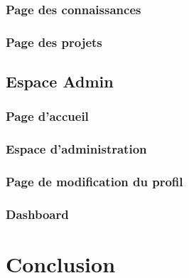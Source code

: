 \documentclass{article}
\begin{document}
            \subsubsection{Page des connaissances}
            \subsubsection{Page des projets}
        \subsection{Espace Admin}
            \subsubsection{Page d'accueil}
            \subsubsection{Espace d'administration}
            \subsubsection{Page de modification du profil}
            \subsubsection{Dashboard}
    \section{Conclusion}
        
\end{document}
